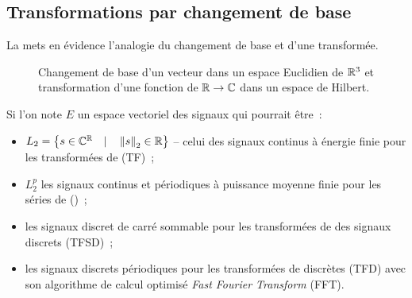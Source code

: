 
\subsection{Transformations par changement de base}
La  mets en évidence l'analogie du changement de
base et d'une transformée.

\begin{figure}[ht]
  \centering
  \caption{Changement de base d'un vecteur dans un espace Euclidien de
    $\mathbb{R}^3$ et transformation d'une fonction de $\mathbb{R}\rightarrow\mathbb{C}$ dans
    un espace de Hilbert.}
  \label{fig:espaces}
\end{figure}

Si l'on note $E$ un espace vectoriel des signaux qui pourrait être~:

\begin{itemize}
\item $L_2 = \left\{s \in \mathbb{C}^{\mathbb{R}} \quad|\quad \left\|s\right\|_2 \in \mathbb{R}\right\}$ -- celui des
signaux continus à énergie finie pour les transformées de \Fourier{}
(TF)~;
\item $L_2^p$ les signaux continus et périodiques à puissance moyenne
  finie pour les séries de \Fourier{} (\sdf)~;
\item les signaux discret de carré sommable pour les transformées de \Fourier{}
  des signaux discrets (TFSD)~;
\item les signaux discrets périodiques pour les transformées de
  \Fourier{} discrètes (TFD) avec son algorithme de calcul optimisé
  \emph{Fast Fourier Transform} (FFT).
\end{itemize}

